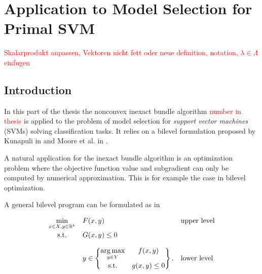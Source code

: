 \section{Application to Model Selection for Primal SVM}

\textcolor{red}{Skalarprodukt anpassen, Vektoren nicht fett oder neue definition, notation, \(\lambda \in \Lambda\) einfugen}

\subsection{Introduction}

In this part of the thesis the nonconvex inexact bundle algorithm \textcolor{red}{number in thesis} is applied to the problem of model selection for \emph{support vector machines} (SVMs) solving classification tasks.
It relies on a bilevel formulation proposed by Kunapuli in \cite{Kunapuli2008} and Moore et al. in \cite{Moore2011}.

A natural application for the inexact bundle algorithm is an optimization problem where the objective function value and subgradient can only be computed by numerical approximation. This is for example the case in bilevel optimization.

A general bilevel program can be formulated as in \cite[p. 20]{Kunapuli2008}

\begin{equation}
	\begin{array}{cll}
	\displaystyle\min_{x \in X, y \in \R^k} & F(x,y) & \text{upper level} \vspace{0.5ex}\\
	\text{s.t.} & G(x,y) \leq 0 & \vspace{1em}\\
	& y \in \begin{Bmatrix} \displaystyle\argmax_{y\in Y} & f(x,y) \vspace{0.5ex}\\
	                        \text{s.t.} & g(x,y) \leq 0 
													\end{Bmatrix}. & \text{lower level}
	\end{array}
	\label{bilevel}
\end{equation}

